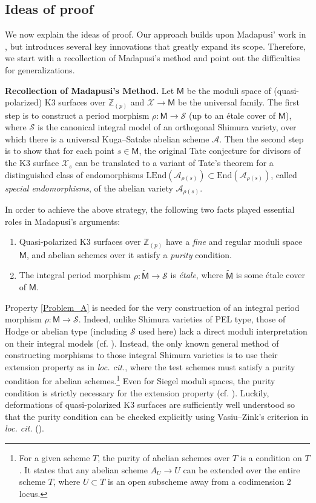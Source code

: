 \documentclass[11pt, letterpaper]{amsart}
\theoremstyle{plain}
\theoremstyle{definition}
\newcommand{\IZ}{\mathbb{Z}}
\newcommand{\End}{\mathrm{End}}
\newcommand{\<}{\langle}
\renewcommand{\>}{\rangle}
\def\wt{\widetilde}
\newcommand{\shS}{\mathscr{S}}
\newcommand{\sfM}{\mathsf{M}}
\newcommand{\sA}{\mathcal{A}}
\newcommand{\sX}{\mathcal{X}}
\newcommand{\LEnd}{\mathrm{LEnd}}
\begin{document}
\subsection{Ideas of proof}
\label{sub:ideals_of_proof}
We now explain the ideas of proof.
Our approach builds upon Madapusi' work in \cite{MPTate}, but introduces several key innovations that greatly expand its scope. Therefore, we start with a recollection of Madapusi's method and point out the difficulties for generalizations.

\textbf{Recollection of Madapusi's Method.} Let $\sfM$ be the moduli space of (quasi-polarized) K3 surfaces over $\IZ_{(p)}$ and $\sX\to \sfM$ be the universal family.
The first step is to construct a period morphism $\rho:\sfM \to \shS$ (up to an \'etale cover of $\sfM$), where $\shS$ is the canonical integral model of an orthogonal Shimura variety, over which there is a universal Kuga--Satake abelian scheme $\sA$. 
Then the second step is to show that for each point $s \in \sfM$, the original Tate conjecture for divisors of the K3 surface $\sX_s$ can be translated to a variant of Tate's theorem for a distinguished class of endomorphisms $\LEnd(\sA_{\rho(s)})\subset \End(\sA_{\rho(s)})$, called \textit{special endomorphisms}, of the abelian variety $\sA_{\rho(s)}$.


In order to achieve the above strategy, the following two facts played essential roles in Madapusi's arguments:
\begin{enumerate}[label=\upshape{(\Alph*)}]
	\item\label{Problem_A}  Quasi-polarized K3 surfaces over $\IZ_{(p)}$ have a \textit{fine} and regular moduli space $\sfM$, and abelian schemes over it satisfy a \emph{purity} condition. 
	\item\label{Problem_B}  The integral period morphism $\rho : \wt{\sfM} \to \shS$ is \textit{\'etale}, where $\wt{\sfM}$ is some \'etale cover of $\sfM$. 
\end{enumerate}
Property \ref{Problem_A} is needed for the very construction of an integral period morphism $\rho : \sfM \to \shS$. 
Indeed, unlike Shimura varieties of PEL type, those of Hodge or abelian type (including $\shS$ used here) lack a direct moduli interpretation on their integral models (cf. \cite{KisinInt}). 
Instead, the only known general method of constructing morphisms to those integral Shimura varieties is to use their extension property as in \textit{loc. cit.}, where the test schemes must satisfy a purity condition for abelian schemes.\footnote{For a given scheme $T$, the purity of abelian schemes over $T$ is a condition on $T$.
	It states that any abelian scheme $A_U\to U$ can be extended over the entire scheme $T$, where $U\subset T$ is an open subscheme away from a codimension $2$ locus.}
Even for Siegel moduli spaces, the purity condition is strictly necessary for the extension property (cf. \cite[\S6~Remarks]{VasiuZink}).
Luckily, deformations of quasi-polarized K3 surfaces are sufficiently well understood so that the purity condition can be checked explicitly using Vasiu--Zink's criterion in \textit{loc. cit.} (\cite[Thm.~3.8]{MPTate}).
\end{document}
